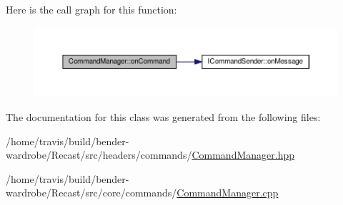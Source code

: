 Here is the call graph for this function\-:
\nopagebreak
\begin{figure}[H]
\begin{center}
\leavevmode
\includegraphics[width=350pt]{class_command_manager_abef8721bbe32e1ecb22f2f3d3b8c0601_cgraph}
\end{center}
\end{figure}




The documentation for this class was generated from the following files\-:\begin{DoxyCompactItemize}
\item 
/home/travis/build/bender-\/wardrobe/\-Recast/src/headers/commands/\hyperlink{_command_manager_8hpp}{Command\-Manager.\-hpp}\item 
/home/travis/build/bender-\/wardrobe/\-Recast/src/core/commands/\hyperlink{_command_manager_8cpp}{Command\-Manager.\-cpp}\end{DoxyCompactItemize}
